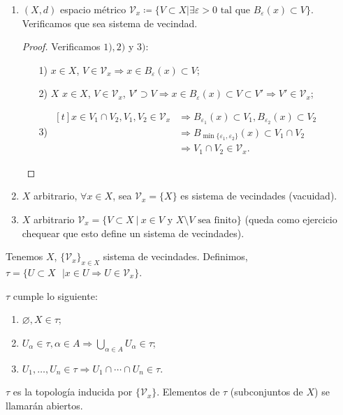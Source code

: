 	\begin{eg}
		\begin{enumerate}
			\item $(X,d)$ espacio métrico $\mathcal{V}_x \coloneq \{ V \subset X | \exists \varepsilon > 0 \text{ tal que } B_{\varepsilon} (x) \subset V \}$. Verificamos que sea sistema de vecindad.

			\begin{proof}[Proof]
				Verificamos $1),2)$ y $3)$:
				\begin{enumerate}
					\item[1)] $x \in X$, $V \in \mathcal{V}_x \Rightarrow x \in B_{\varepsilon} (x) \subset V$;

					\item[2)] $X$ $x \in X$, $V \in \mathcal{V}_x$, $V' \supset V \Rightarrow x \in B_{\varepsilon} (x) \subset V \subset V' \Rightarrow V' \in \mathcal{V}_x$;

					\item[3)] $\begin{aligned}[t]
						x \in V_1 \cap V_2, V_1,V_2 \in \mathcal{V}_x & \Rightarrow B_{\varepsilon_1} (x) \subset V_1, B_{\varepsilon_2} (x) \subset V_2  \\ & \Rightarrow B_{\min \{ \varepsilon_1, \varepsilon_2 \}} (x) \subset V_1 \cap V_2 \\ & \Rightarrow V_1 \cap V_2 \in \mathcal{V}_x.
					\end{aligned}$
				\end{enumerate}
			\end{proof}

			\item $X$ arbitrario, $\forall x \in X$, sea $\mathcal{V}_x = \{ X \}$ es sistema de vecindades (vacuidad).

			\item $X$ arbitrario $\mathcal{V}_x = \{ V \subset X \ | \ x \in V \text{ y } X \setminus V \text{ sea finito} \}$ (queda como ejercicio chequear que esto define un sistema de vecindades).  
		\end{enumerate}
	\end{eg}

	\begin{definition}
		Tenemos $X$, $\{ \mathcal{V}_x \}_{x \in X}$ sistema de vecindades. Definimos, $\tau = \{ U \subset X \text{ } | x \in U \Rightarrow U \in \mathcal{V}_x \}$.    
	\end{definition}

	\begin{lemma}
		$\tau$ cumple lo siguiente:

		\begin{enumerate}
			\item $\varnothing, X \in \tau$;

			\item $U_{\alpha} \in \tau, \alpha \in A \Rightarrow \bigcup_{\alpha \in A} U_{\alpha} \in \tau$;

			\item $U_1,\dots,U_n \in \tau \Rightarrow U_1 \cap \cdots \cap U_n \in \tau$.
		\end{enumerate}
	\end{lemma}

	$\tau$ es la topología inducida por $\{ \mathcal{V}_x \}$. Elementos de $\tau$ (subconjuntos de $X$) se llamarán abiertos.
